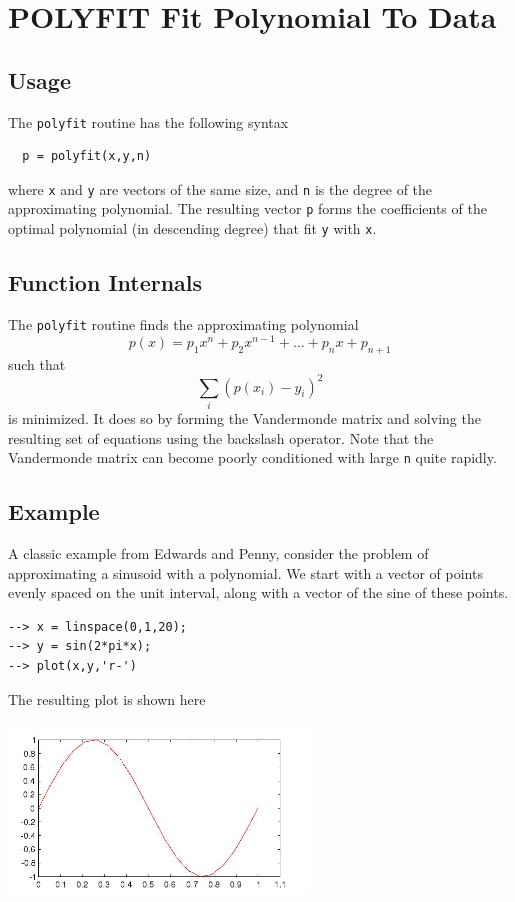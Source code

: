 \section{POLYFIT Fit Polynomial To Data}

\subsection{Usage}

The \verb|polyfit| routine has the following syntax
\begin{verbatim}
  p = polyfit(x,y,n)
\end{verbatim}
where \verb|x| and \verb|y| are vectors of the same size, and
\verb|n| is the degree of the approximating polynomial.  
The resulting vector \verb|p| forms the coefficients of
the optimal polynomial (in descending degree) that fit
\verb|y| with \verb|x|.  
\subsection{Function Internals}

The \verb|polyfit| routine finds the approximating polynomial
\[
   p(x) = p_1 x^n + p_2 x^{n-1} + \dots + p_n x + p_{n+1}
\]
such that
\[
   \sum_{i} (p(x_i) - y_i)^2
\]
is minimized.  It does so by forming the Vandermonde matrix
and solving the resulting set of equations using the backslash
operator.  Note that the Vandermonde matrix can become poorly
conditioned with large \verb|n| quite rapidly.
\subsection{Example}

A classic example from Edwards and Penny, consider the problem
of approximating a sinusoid with a polynomial.  We start with
a vector of points evenly spaced on the unit interval, along with
a vector of the sine of these points.
\begin{verbatim}
--> x = linspace(0,1,20);
--> y = sin(2*pi*x);
--> plot(x,y,'r-')
\end{verbatim}
The resulting plot is shown here


\centerline{\includegraphics[width=8cm]{polyfit1}}

